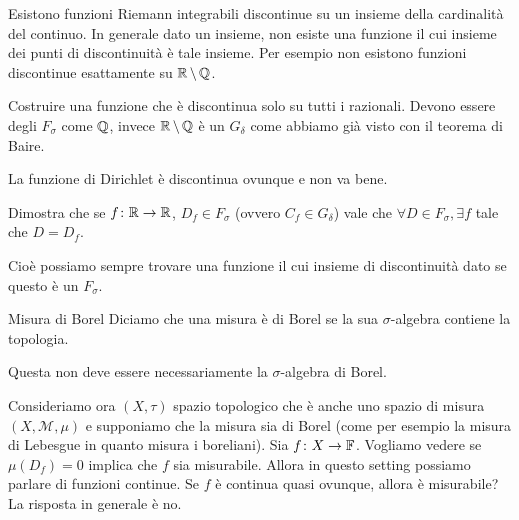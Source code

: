 \documentclass[a4paper]{article}
\begin{document}
\begin{radioactive}
Esistono funzioni Riemann integrabili discontinue su un insieme della cardinalità del continuo.
In generale dato un insieme, non esiste una funzione
il cui insieme dei punti di discontinuità è tale insieme.
Per esempio non esistono funzioni discontinue esattamente su \(\mathbb{R} \,\backslash\, \mathbb{Q}\).
\end{radioactive}
\begin{radioactive}
\begin{snippetexercise}{}
    Costruire una funzione che è discontinua solo su tutti i razionali.
    Devono essere degli \(F_\sigma\) come \(\mathbb{Q}\),
    invece \(\mathbb{R}\,\backslash\,\mathbb{Q}\) è un \(G_\delta\)
    come abbiamo già visto con il teorema di Baire.
\end{snippetexercise}
\end{radioactive}
\begin{radioactive}
La funzione di Dirichlet è discontinua ovunque e non va bene.
\end{radioactive}
\begin{radioactive}
\begin{snippetexercise}{}
    Dimostra che se \(f \colon \mathbb{R} \to \mathbb{R}\),
    \(D_f \in F_\sigma\) (ovvero \(C_f \in G_\delta\))
    vale che \(\forall D \in F_\sigma, \exists f\) tale che \(D = D_f\).
\end{snippetexercise}
\end{radioactive}
\begin{radioactive}
Cioè possiamo sempre trovare una funzione il cui insieme di discontinuità
dato se questo è un \(F_\sigma\).
\end{radioactive}

\begin{radioactive}
\begin{snippetdefinition}{Misura di Borel}
    Diciamo che una misura è di Borel se la sua \(\sigma\)-algebra contiene la topologia.
\end{snippetdefinition}
\end{radioactive}
\begin{radioactive}
Questa non deve essere necessariamente la \(\sigma\)-algebra di Borel.
\end{radioactive}

\begin{radioactive}
Consideriamo ora \((X, \tau)\) spazio topologico
che è anche uno spazio di misura \((X, \mathcal M, \mu)\)
e supponiamo che la misura sia di Borel (come per esempio la misura di Lebesgue in quanto misura i boreliani).
Sia \(f \colon X \to \mathbb F\).
Vogliamo vedere se \(\mu(D_f) = 0\) implica che \(f\) sia misurabile.
Allora in questo setting possiamo parlare di funzioni continue.
Se \(f\) è continua quasi ovunque, allora è misurabile?
La risposta in generale è no.
\end{radioactive}
\end{document}
